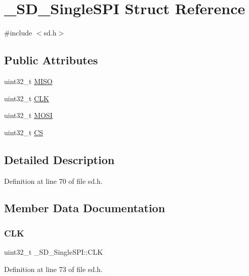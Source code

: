 \hypertarget{struct__SD__SingleSPI}{}\section{\+\_\+\+S\+D\+\_\+\+Single\+S\+PI Struct Reference}
\label{struct__SD__SingleSPI}


{\ttfamily \#include $<$sd.\+h$>$}

\subsection*{Public Attributes}
\begin{DoxyCompactItemize}
\item 
uint32\+\_\+t \mbox{\hyperlink{struct__SD__SingleSPI_a9cbb5894e13ae933db7245887cf65e09}{M\+I\+SO}}
\item 
uint32\+\_\+t \mbox{\hyperlink{struct__SD__SingleSPI_ae7c217ba6ab526f8a0f09dd6abc5a610}{C\+LK}}
\item 
uint32\+\_\+t \mbox{\hyperlink{struct__SD__SingleSPI_a734dc6425b932e98f059295c613b2f44}{M\+O\+SI}}
\item 
uint32\+\_\+t \mbox{\hyperlink{struct__SD__SingleSPI_aa39888dd22c89ce4fb762fe66be4b7ba}{CS}}
\end{DoxyCompactItemize}


\subsection{Detailed Description}


Definition at line 70 of file sd.\+h.



\subsection{Member Data Documentation}
\mbox{\label{struct__SD__SingleSPI_ae7c217ba6ab526f8a0f09dd6abc5a610}} 
\subsubsection{\texorpdfstring{CLK}{CLK}}
{\footnotesize\ttfamily uint32\+\_\+t \+\_\+\+S\+D\+\_\+\+Single\+S\+P\+I\+::\+C\+LK}



Definition at line 73 of file sd.\+h.

